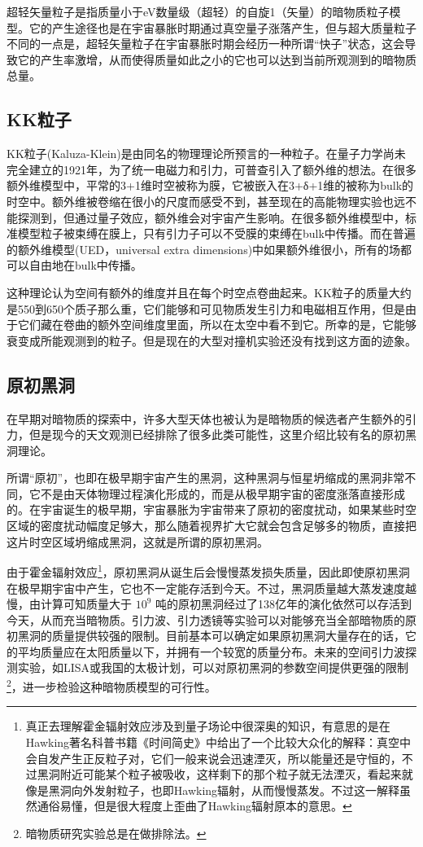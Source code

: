 \documentclass{ctexart}
\begin{document}
	超轻矢量粒子是指质量小于eV数量级（超轻）的自旋1（矢量）的暗物质粒子模型。它的产生途径也是在宇宙暴胀时期通过真空量子涨落产生，但与超大质量粒子不同的一点是，超轻矢量粒子在宇宙暴胀时期会经历一种所谓“快子”状态，这会导致它的产生率激增，从而使得质量如此之小的它也可以达到当前所观测到的暗物质总量。
	\subsection{KK粒子}
	KK粒子(Kaluza-Klein)是由同名的物理理论所预言的一种粒子。在量子力学尚未完全建立的1921年，为了统一电磁力和引力，可普查引入了额外维的想法。在很多额外维模型中，平常的3+1维时空被称为膜，它被嵌入在3+δ+1维的被称为bulk的时空中。额外维被卷缩在很小的尺度而感受不到，甚至现在的高能物理实验也远不能探测到，但通过量子效应，额外维会对宇宙产生影响。在很多额外维模型中，标准模型粒子被束缚在膜上，只有引力子可以不受膜的束缚在bulk中传播。而在普遍的额外维模型(UED，universal extra dimensions)中如果额外维很小，所有的场都可以自由地在bulk中传播。
	
	这种理论认为空间有额外的维度并且在每个时空点卷曲起来。KK粒子的质量大约是550到650个质子那么重，它们能够和可见物质发生引力和电磁相互作用，但是由于它们藏在卷曲的额外空间维度里面，所以在太空中看不到它。所幸的是，它能够衰变成所能观测到的粒子。但是现在的大型对撞机实验还没有找到这方面的迹象。
	\subsection{原初黑洞}
	在早期对暗物质的探索中，许多大型天体也被认为是暗物质的候选者产生额外的引力，但是现今的天文观测已经排除了很多此类可能性，这里介绍比较有名的原初黑洞理论。
	
	所谓“原初”，也即在极早期宇宙产生的黑洞，这种黑洞与恒星坍缩成的黑洞非常不同，它不是由天体物理过程演化形成的，而是从极早期宇宙的密度涨落直接形成的。在宇宙诞生的极早期，宇宙暴胀为宇宙带来了原初的密度扰动，如果某些时空区域的密度扰动幅度足够大，那么随着视界扩大它就会包含足够多的物质，直接把这片时空区域坍缩成黑洞，这就是所谓的原初黑洞。
	
	由于霍金辐射效应\footnote{真正去理解霍金辐射效应涉及到量子场论中很深奥的知识，有意思的是在Hawking著名科普书籍《时间简史》中给出了一个比较大众化的解释：真空中会自发产生正反粒子对，它们一般来说会迅速湮灭，所以能量还是守恒的，不过黑洞附近可能某个粒子被吸收，这样剩下的那个粒子就无法湮灭，看起来就像是黑洞向外发射粒子，也即Hawking辐射，从而慢慢蒸发。不过这一解释虽然通俗易懂，但是很大程度上歪曲了Hawking辐射原本的意思。}，原初黑洞从诞生后会慢慢蒸发损失质量，因此即使原初黑洞在极早期宇宙中产生，它也不一定能存活到今天。不过，黑洞质量越大蒸发速度越慢，由计算可知质量大于 $10^9$ 吨的原初黑洞经过了138亿年的演化依然可以存活到今天，从而充当暗物质。引力波、引力透镜等实验可以对能够充当全部暗物质的原初黑洞的质量提供较强的限制。目前基本可以确定如果原初黑洞大量存在的话，它的平均质量应在太阳质量以下，并拥有一个较宽的质量分布。未来的空间引力波探测实验，如LISA或我国的太极计划，可以对原初黑洞的参数空间提供更强的限制\footnote{暗物质研究实验总是在做排除法。}，进一步检验这种暗物质模型的可行性。
\end{document}
